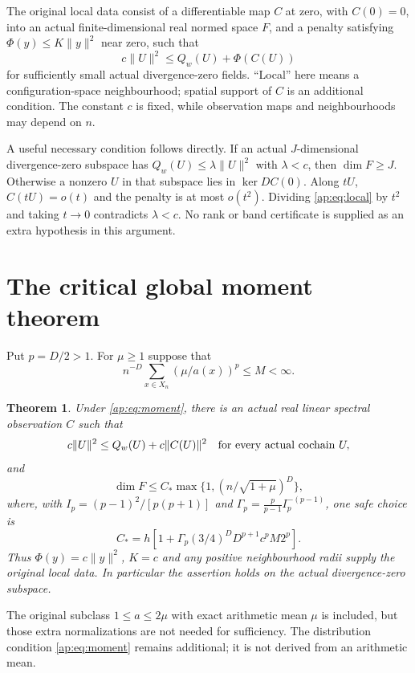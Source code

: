 \documentclass[11pt]{article}
\newtheorem{theorem}{Theorem}[section]
\begin{document}
The original local data consist of a differentiable map $C$ at zero, with $C(0)=0$,
into an actual finite-dimensional real normed space $F$, and a penalty satisfying
$\Phi(y)\leq K\|y\|^2$ near zero, such that
\begin{equation}\label{ap:eq:local}
 c\|U\|^2\leq Q_w(U)+\Phi(C(U))
\end{equation}
for sufficiently small actual divergence-zero fields. ``Local'' here means a
configuration-space neighbourhood; spatial support of $C$ is an additional condition.
The constant $c$ is fixed, while observation maps and neighbourhoods may depend on $n$.

A useful necessary condition follows directly. If an actual $J$-dimensional
divergence-zero subspace has $Q_w(U)\leq\lambda\|U\|^2$ with $\lambda<c$, then
$\dim F\geq J$. Otherwise a nonzero $U$ in that subspace lies in $\ker DC(0)$.
Along $tU$, $C(tU)=o(t)$ and the penalty is at most $o(t^2)$. Dividing
\eqref{ap:eq:local} by $t^2$ and taking $t\to0$ contradicts $\lambda<c$.
No rank or band certificate is supplied as an extra hypothesis in this argument.

\section{The critical global moment theorem}
Put $p=D/2>1$. For $\mu\geq1$ suppose that
\begin{equation}\label{ap:eq:moment}
 n^{-D}\sum_{x\in X_n}(\mu/a(x))^p\leq M<\infty.
\end{equation}
\begin{theorem}\label{ap:thm:critical}
Under \eqref{ap:eq:moment}, there is an actual real linear spectral observation $C$ such that
\[
 c\|U\|^2\leq Q_w(U)+c\|C(U)\|^2
 \quad\hbox{for every actual cochain }U,
\]
and
\begin{equation}\label{ap:eq:rank}
 \dim F\leq C_*\max\{1,(n/\sqrt{1+\mu})^D\},
\end{equation}
where, with $I_p=(p-1)^2/[p(p+1)]$ and
$\Gamma_p=\frac p{p-1}I_p^{-(p-1)}$, one safe choice is
\[
 C_*=h\left[1+\Gamma_p(3/4)^D D^{p+1}c^pM2^p\right].
\]
Thus $\Phi(y)=c\|y\|^2$, $K=c$ and any positive neighbourhood radii supply the original
local data. In particular the assertion holds on the actual divergence-zero subspace.
\end{theorem}
The original subclass $1\leq a\leq2\mu$ with exact arithmetic mean $\mu$ is included,
but those extra normalizations are not needed for sufficiency. The distribution
condition \eqref{ap:eq:moment} remains additional; it is not derived from an arithmetic mean.
\end{document}
